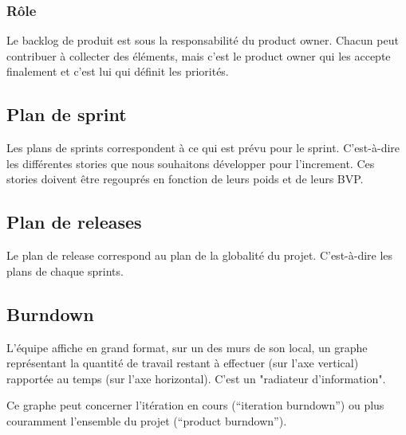 		\subsubsection{Rôle}
			Le backlog de produit est sous la responsabilité du product owner. Chacun peut contribuer à collecter des éléments, mais c'est le product owner qui les accepte finalement et c'est lui qui définit les priorités.
		\subsection{Plan de sprint}
			Les plans de sprints correspondent à ce qui est prévu pour le sprint. C'est-à-dire les différentes stories que nous souhaitons développer pour l'increment. 
			Ces stories doivent être regouprés en fonction de leurs poids et de leurs BVP.
		\subsection{Plan de releases}
			Le plan de release correspond au plan de la globalité du projet. C'est-à-dire les plans de chaque sprints.
		\subsection{Burndown}
			L'équipe affiche en grand format, sur un des murs de son local, un graphe représentant la quantité de travail restant à effectuer (sur l'axe vertical) rapportée au temps (sur l'axe horizontal). 
			C'est un "radiateur d'information".

			Ce graphe peut concerner l'itération en cours (``iteration burndown'') ou plus couramment l'ensemble du projet (``product burndown'').

